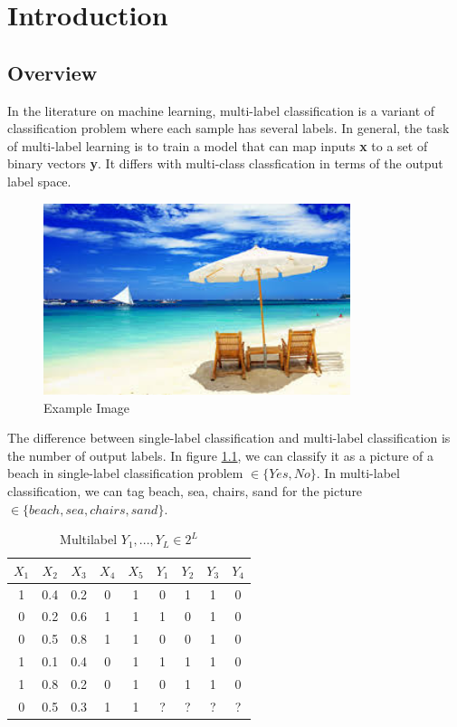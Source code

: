 
\chapter{Introduction} %
\label{Chapter5}

\section{Overview}

In the literature on machine learning, multi-label classification is a variant of classification problem where each sample has several labels. In general, the task of multi-label learning is to train a model that can map inputs \textbf{x} to a set of binary vectors \textbf{y}. It differs with multi-class classfication in terms of the output label space.

\graphicspath{ {./Figures/} }
\begin{figure}[!htb]
    \centering
	\includegraphics[width=0.8\textwidth]{beach.jpg}
    \caption{Example Image}%
    \label{fig:MultilableImage}%
\end{figure}

The difference between single-label classification and multi-label classification is the number of output labels. In figure \ref{fig:MultilableImage}, we can classify it as a picture of a beach in single-label classification problem $\in \{Yes, No\}$. In multi-label classification, we can tag beach, sea, chairs, sand for the picture $\in \{beach, sea, chairs, sand\}$.

\begin{table}
\centering
\begin{tabular}{|c c c c c | c c c c|}
\hline
$X_{1}$ & $X_{2}$ &  $X_{3}$ & $X_{4}$ & $X_{5}$ & $Y_{1}$ & $Y_{2}$ & $Y_{3}$ & $Y_{4}$ \\
\hline
1 & 0.4 & 0.2 & 0 & 1 & 0 & 1 & 1 & 0 \\
0 & 0.2 & 0.6 & 1 & 1 & 1 & 0 & 1 & 0 \\
0 & 0.5 & 0.8 & 1 & 1 & 0 & 0 & 1 & 0 \\
1 & 0.1 & 0.4 & 0 & 1 & 1 & 1 & 1 & 0 \\
1 & 0.8 & 0.2 & 0 & 1 & 0 & 1 & 1 & 0 \\
\hline
0 & 0.5 & 0.3 & 1 & 1 & ? & ? & ? & ? \\
\hline
\end{tabular}
\caption{Multilabel $Y_{1},...,Y_{L} \in 2^L$}
\label{tab:MultilabelTable}
\end{table}

